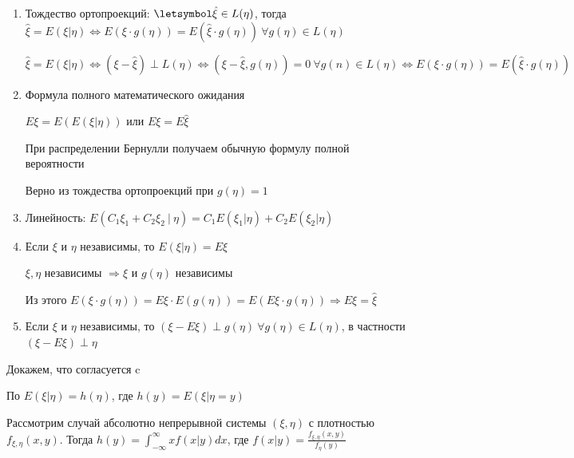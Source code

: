 \begin{enumerate}

    \item Тождество ортопроекций: $\letsymbol \hat{\xi} \in L(\eta)$, тогда $\hat{\xi} = E(\xi|\eta) \Longleftrightarrow E(\xi\cdot g(\eta)) = E(\hat{\xi}\cdot g(\eta)) \ \forall g(\eta) \in L(\eta)$

    \begin{MyProof}
        $\hat{\xi} = E(\xi|\eta) \Longleftrightarrow (\xi - \hat{\xi}) \perp L(\eta) \Longleftrightarrow 
        (\xi - \hat{\xi}, g(\eta)) = 0 \ \forall g(n) \in L(\eta) \Longleftrightarrow E(\xi\cdot g(\eta)) = E(\hat{\xi}\cdot g(\eta))$
    \end{MyProof}

    \item Формула полного математического ожидания

    $E\xi = E(E(\xi|\eta))$ или $E\xi = E\hat{\xi}$

    \Nota При распределении Бернулли получаем обычную формулу полной вероятности

    \begin{MyProof}
        Верно из тождества ортопроекций при $g(\eta) = 1$
    \end{MyProof}

    \item Линейность: $E(C_1\xi_1 + C_2\xi_2 \ | \ \eta) = C_1 E(\xi_1|\eta) + C_2 E(\xi_2|\eta)$

    \item Если $\xi$ и $\eta$ независимы, то $E(\xi|\eta) = E\xi$

    \begin{MyProof}
        $\xi, \eta$ независимы $\Longrightarrow \xi$ и $g(\eta)$ независимы

        Из этого $E(\xi \cdot g(\eta)) = E\xi \cdot E(g(\eta)) = E(E\xi \cdot g(\eta)) \Longrightarrow E\xi = \hat{\xi}$
    \end{MyProof}

    \item Если $\xi$ и $\eta$ независимы, то $(\xi - E\xi) \perp g(\eta) \ \forall g(\eta) \in L(\eta)$, 
    в частности $(\xi - E\xi) \perp \eta$

\end{enumerate}

Докажем, что  согласуется c 

По  $E(\xi|\eta) = h(\eta)$, где $h(y) = E(\xi|\eta = y)$

Рассмотрим случай абсолютно непрерывной системы $(\xi, \eta)$ с плотностью $f_{\xi,\eta}(x, y)$.
Тогда $h(y) = \int_{-\infty}^\infty xf(x|y)dx$, где $f(x|y) = \frac{f_{\xi,\eta}(x, y)}{f_\eta(y)}$

